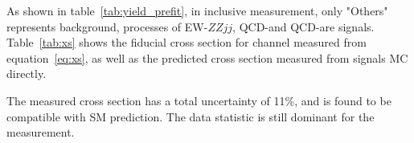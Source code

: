 As shown in table~\ref{tab:yield_prefit}, in inclusive measurement, only "Others" represents background, 
processes of EW-$ZZjj$, QCD-\qqZZ and QCD-\ggZZ are signals.
Table~\ref{tab:xs} shows the fiducial cross section for \llll channel measured from equation~\ref{eq:xs}, 
as well as the predicted cross section measured from signals MC directly.
\begin{table}[!htbp]
\begin{center}
\end{center}
\caption{
Measured and predicted fiducial cross-sections in \lllljj final-state.
Uncertainties due to different sources are presented.
}
\label{tab:xs}
\end{table}
The measured cross section has a total uncertainty of 11\%, and is found to be compatible with SM prediction.
The data statistic is still dominant for the measurement.
